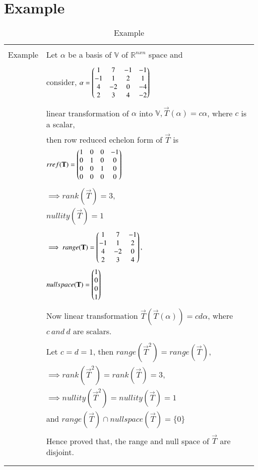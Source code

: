 \documentclass[journal,12pt]{IEEEtran}
\begin{document}
\section{\textbf{Example}}
\renewcommand{\thetable}{2}
\begin{longtable}{|l|l|}
\hline
\multirow{3}{*}{Example} & \\
& Let $\alpha$ be a basis of $\mathbb{V}$ of $\mathbb{R}^{nxn}$ space and\\
& \\
& consider, $\alpha = \begin{pmatrix}1&7&-1&-1\\-1&1&2&1\\4&-2&0&-4\\2&3&4&-2\end{pmatrix}$\\
& \\
& linear transformation of $\alpha$ into $\mathbb{V}, \vec{T}(\alpha) = c\alpha$, where $c$ is a scalar,\\
& then row reduced echelon form of $\vec{T}$ is\\
& $rref(\mathbf{T}) = \begin{pmatrix}1&0&0&-1\\0&1&0&0\\0&0&1&0\\0&0&0&0\end{pmatrix}$\\
& \\
& $\implies rank(\vec{T}) = 3,$\\
& $nullity(\vec{T}) = 1$\\
& \\
& $\implies range(\mathbf{T}) = \begin{pmatrix}1&7&-1\\-1&1&2\\4&-2&0\\2&3&4\end{pmatrix},$\\
& $null space(\mathbf{T}) = \begin{pmatrix}1\\0\\0\\1\end{pmatrix}$\\
& \\
& Now linear transformation $\vec{T}(\vec{T}(\alpha)) = cd\alpha$, where $c \  and \  d$ are scalars.\\
& \\
& Let $ c = d = 1$, then $range(\vec{T}^2) = range (\vec{T})$,\\
& $\implies rank (\vec{T}^2) = rank (\vec{T}) = 3$,\\
& $\implies nullity (\vec{T}^2) = nullity (\vec{T}) = 1$\\
& and $range(\vec{T}) \cap nullspace(\vec{T}) = \lbrace 0\rbrace$\\
& \\
& Hence proved that, the range and null space of $\vec{T}$ are disjoint.\\
& \\
\hline
\caption{Example}
\label{table:2}
\end{longtable}
\end{document}
